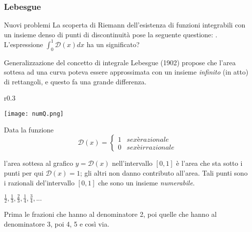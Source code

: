 \begin{frame}[label=Lebesgue]
  \frametitle{Lebesgue}
  \begin{block}{Nuovi problemi}    
    La scoperta di Riemann dell'esistenza di funzioni integrabili con un insieme denso di punti di discontinuità
    pose la seguente questione: . L'espressione 
      $\int^1_0 \mathcal{D} (x) dx $
    ha un significato?
  \end{block}  
  \begin{block}{Generalizzazione del concetto di integrale}
    Lebesgue (1902) propose che l'area sottesa ad una curva poteva essere approssimata con un insieme \textit{infinito} (in atto)
    di rettangoli, e questo fa una grande differenza. 
    \begin{wrapfigure}{r}{0.3\textwidth}
    \begin{center}
      \texttt{[image: numQ.png]}
    \end{center}
    \end{wrapfigure}        Data la funzione 
    \begin{equation*}
      \mathcal{D}(x) =
      \begin{cases*}
        1 & se x è razionale \\
        0 & se x è irrazionale
      \end{cases*}
    \end{equation*}

    l'area sottesa al grafico $y=\mathcal{D} (x)$ nell'intervallo $[0,1]$ è l'area che sta sotto i punti per qui $\mathcal{D} (x)=1$; 
    gli altri non danno contributo all'area. Tali punti sono i razionali del'intervallo $[0,1]$ che sono un insieme \textit{numerabile}.
    \begin{center}
      $\frac{1}{2},\frac{1}{3},\frac{2}{3},\frac{1}{4},\frac{3}{4},...$
    \end{center}
    Prima le frazioni che hanno al denominatore 2, poi quelle che hanno al denominatore 3, poi 4, 5 e così via.
  \end{block}  
\end{frame}      


